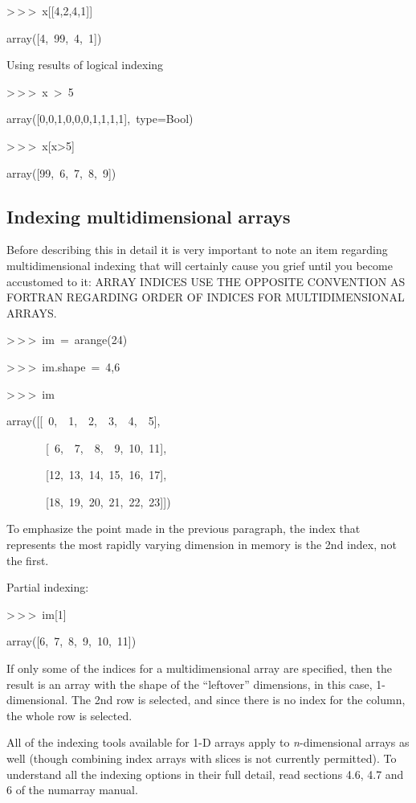 \begin{lyxcode}
>\,{}>\,{}>~x{[}{[}4,2,4,1]]

array({[}4,~99,~4,~1])
\end{lyxcode}
Using results of logical indexing 

\begin{lyxcode}
>\,{}>\,{}>~x~>~5

array({[}0,0,1,0,0,0,1,1,1,1],~type=Bool)

>\,{}>\,{}>~x{[}x>5]

array({[}99,~6,~7,~8,~9])
\end{lyxcode}

\subsection{Indexing multidimensional arrays}

Before describing this in detail it is very important to note an item
regarding multidimensional indexing that will certainly cause you
grief until you become accustomed to it: ARRAY INDICES USE THE OPPOSITE
CONVENTION AS FORTRAN REGARDING ORDER OF INDICES FOR MULTIDIMENSIONAL
ARRAYS.

\begin{lyxcode}
>\,{}>\,{}>~im~=~arange(24)

>\,{}>\,{}>~im.shape~=~4,6

>\,{}>\,{}>~im

array({[}{[}~0,~~1,~~2,~~3,~~4,~~5],

~~~~~~~{[}~6,~~7,~~8,~~9,~10,~11],

~~~~~~~{[}12,~13,~14,~15,~16,~17],

~~~~~~~{[}18,~19,~20,~21,~22,~23]])
\end{lyxcode}
To emphasize the point made in the previous paragraph, the index that
represents the most rapidly varying dimension in memory is the 2nd
index, not the first. 

Partial indexing:

\begin{lyxcode}
>\,{}>\,{}>~im{[}1]

array({[}6,~7,~8,~9,~10,~11])
\end{lyxcode}
If only some of the indices for a multidimensional array are specified,
then the result is an array with the shape of the {}``leftover''
dimensions, in this case, 1-dimensional. The 2nd row is selected,
and since there is no index for the column, the whole row is selected.

All of the indexing tools available for 1-D arrays apply to \emph{n}-dimensional
arrays as well (though combining index arrays with slices is not currently
permitted). To understand all the indexing options in their full detail,
read sections 4.6, 4.7 and 6 of the numarray manual.


